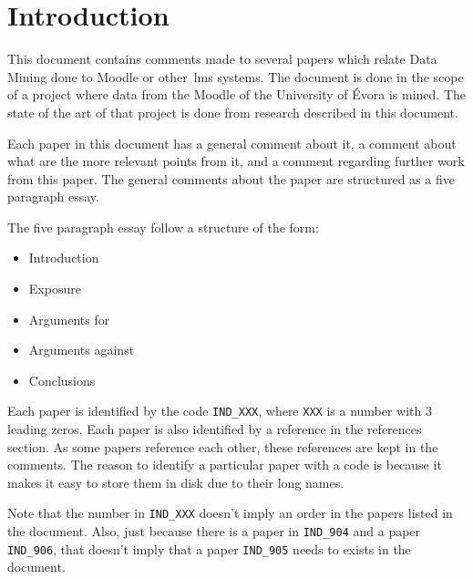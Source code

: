 \chapter{Introduction}

This document contains comments made to several papers which relate Data Mining
done to Moodle or other~\gls{lms} systems. The document is done in the scope of
a project where data from the Moodle of the University of Évora is mined. The
state of the art of that project is done from research described in this
document.

Each paper in this document has a general comment about it, a comment about
what are the more relevant points from it, and a comment regarding further work
from this paper. The general comments about the paper are structured as a five
paragraph essay.

The five paragraph essay follow a structure of the form:

\begin{itemize}
    \item Introduction
    \item Exposure
    \item Arguments for
    \item Arguments against
    \item Conclusions
\end{itemize}

Each paper is identified by the code \texttt{IND\_XXX}, where \texttt{XXX} is a
number with 3 leading zeros. Each paper is also identified by a reference in
the references section. As some papers reference each other, these references
are kept in the comments. The reason to identify a particular paper with a code
is because it makes it easy to store them in disk due to their long names.

Note that the number in \texttt{IND\_XXX} doesn't imply an order in the papers
listed in the document. Also, just because there is a paper in
\texttt{IND\_904} and a paper \texttt{IND\_906}, that doesn't imply that a
paper \texttt{IND\_905} needs to exists in the document.
